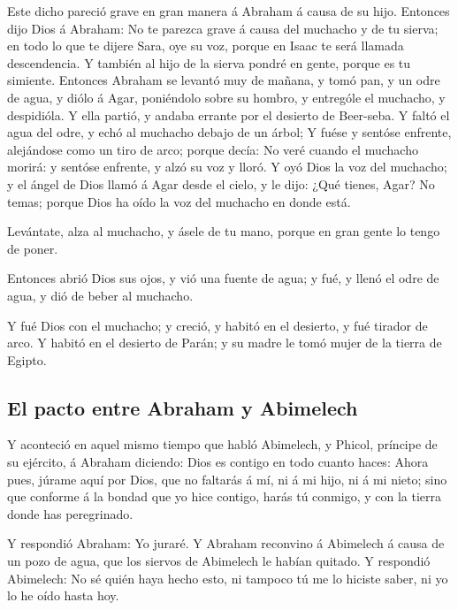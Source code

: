  Este dicho pareció grave en gran manera á Abraham á causa
de su hijo.  Entonces dijo Dios á Abraham: No te parezca
grave á causa del muchacho y de tu sierva; en todo lo que te dijere
Sara, oye su voz, porque en Isaac te será llamada descendencia.
 Y también al hijo de la sierva pondré en gente, porque es
tu simiente.  Entonces Abraham se levantó muy de mañana, y
tomó pan, y un odre de agua, y diólo á Agar, poniéndolo sobre su hombro,
y entrególe el muchacho, y despidióla. Y ella partió, y andaba errante
por el desierto de Beer-seba.  Y faltó el agua del odre, y
echó al muchacho debajo de un árbol;  Y fuése y sentóse
enfrente, alejándose como un tiro de arco; porque decía: No veré cuando
el muchacho morirá: y sentóse enfrente, y alzó su voz y lloró.
 Y oyó Dios la voz del muchacho; y el ángel de Dios llamó á
Agar desde el cielo, y le dijo: ¿Qué tienes, Agar? No temas; porque Dios
ha oído la voz del muchacho en donde está.

 Levántate, alza al muchacho, y ásele de tu mano, porque en
gran gente lo tengo de poner.

 Entonces abrió Dios sus ojos, y vió una fuente de agua; y
fué, y llenó el odre de agua, y dió de beber al muchacho.

 Y fué Dios con el muchacho; y creció, y habitó en el
desierto, y fué tirador de arco.  Y habitó en el desierto
de Parán; y su madre le tomó mujer de la tierra de Egipto.

\hypertarget{el-pacto-entre-abraham-y-abimelech}{%
\subsection{El pacto entre Abraham y
Abimelech}\label{el-pacto-entre-abraham-y-abimelech}}

 Y aconteció en aquel mismo tiempo que habló Abimelech, y
Phicol, príncipe de su ejército, á Abraham diciendo: Dios es contigo en
todo cuanto haces:  Ahora pues, júrame aquí por Dios, que
no faltarás á mí, ni á mi hijo, ni á mi nieto; sino que conforme á la
bondad que yo hice contigo, harás tú conmigo, y con la tierra donde has
peregrinado.

 Y respondió Abraham: Yo juraré.  Y Abraham
reconvino á Abimelech á causa de un pozo de agua, que los siervos de
Abimelech le habían quitado.  Y respondió Abimelech: No sé
quién haya hecho esto, ni tampoco tú me lo hiciste saber, ni yo lo he
oído hasta hoy.

